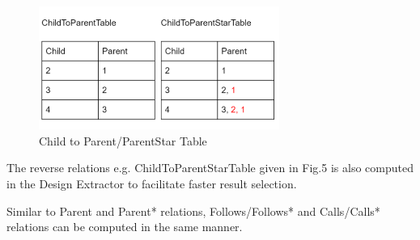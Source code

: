 \documentclass[12pt]{article}
\begin{document}
{{{{{{{{{{\begin{figure}[htbp]
  \caption{Child to Parent/ParentStar Table}
  \centering  \includegraphics[width=0.7\textwidth]{ParentTable2.png}
\end{figure}
\vspace{4mm}
The reverse relations e.g. ChildToParentStarTable given in Fig.5 is also computed in the Design Extractor to facilitate faster result selection.

Similar to Parent and Parent* relations, Follows/Follows* and Calls/Calls* relations can be computed in the same manner.

}}}}}}}}}}
\end{document}
